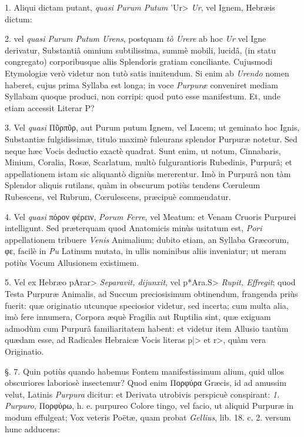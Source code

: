 \documentclass[a4paper, 11pt, oneside, polutonikogreek, german]{article}
\begin{document}
1. Aliqui dictam putant, \emph{quasi Purum Putum} \<'Ur> \emph{Ur}, vel Ignem, Hebræis dictum:

2. vel \emph{quasi Purum Putum Urens}, postquam \emph{tò Urere} ab hoc \emph{Ur} vel Igne derivatur, Substantiâ omnium subtilissima, summè mobili, lucidâ, (in statu congregato) corporibusque aliis Splendoris gratiam conciliante. Cujusmodi Etymologiæ verò videtur non tutò satis innitendum. Si enim ab \emph{Urendo} nomen haberet, cujus prima Syllaba est longa; in voce \emph{Purpuræ} conveniret mediam Syllabam quoque produci, non corripi: quod puto esse manifestum. Et, unde etiam accessit Literar P?

3. Vel \emph{quasi} Πῦρπῦρ, aut Purum putum Ignem, vel Lucem; ut geminato hoc Ignis, Substantiæ fulgidissimæ, titulo maximè fuleurans splendor Purpuræ notetur. Sed neque hæc Vocis deductio exactè quadrat. Sunt enim, ut notum, Cinnabaris, Minium, Coralia, Rosæ, Scarlatum, multò fulgurantioris Rubedinis, Purpurâ; et appellationem istam sic aliquantò digniùs mererentur. Imò in Purpurâ non tàm Splendor aliquis rutilans, quàm in obscurum potiùs tendens Cœruleum Rubescens, vel Rubrum, Cœrulescens, præcipuè commendatur.

4. Vel \emph{quasi} πόρον φέρειν, \emph{Porum Ferre}, vel Meatum: et Venam Cruoris Purpurei intelligunt. Sed præterquam quod Anatomicis minùs usitatum est, \emph{Pori} appellationem tribuere \emph{Venis} Animalium; dubito etiam, an Syllaba Græcorum, φε, facilè in \emph{Pu} Latinum mutata, in ullis nominibus aliis inveniatur; ut meram potiùs Vocum Allusionem existimem.

5. Vel ex Hebræo \<pArar> \emph{Separavit, dijunxit}, vel \<p*Ara.S> \emph{Rupit, Effregit}; quod Testa Purpuræ Animalis, ad Succum preciosisimum obtinendum, frangenda priùs fuerit: quæ originatio utcunque speciosior videtur, sed incerta; cum multa alia, imò fere innumera, Corpora æquè Fragilia aut Ruptilia sint, quæ exiguam admodùm cum Purpurâ familiaritatem habent: et videtur item Allusio tantùm quædam esse, ad Radicales Hebraicæ Vocis literas \<p|> et \<r>, quàm vera Originatio.

§. 7. Quin potiùs quando habemus Fontem manifestissimum alium, quid ullos obscuriores laboriosè insectemur? Quod enim Πορφύρα Græcis, id ad amussim velut, Latinis \emph{Purpura} dicitur: et Derivata utrobivis perspicuè conspirant: \emph{1.} \emph{Purpuro}, Πορφύρω, h. e. purpureo Colore tingo, vel facio, ut aliquid Purpuræ in modum effulgeat; Vox veteris Poëtæ, quam probat \emph{Gellius}, lib. 18. c. 2. versum hunc adducens:
\end{document}
